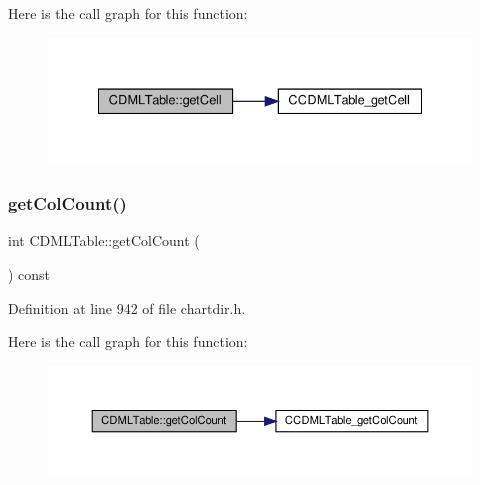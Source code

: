 Here is the call graph for this function\+:
\nopagebreak
\begin{figure}[H]
\begin{center}
\leavevmode
\includegraphics[width=335pt]{class_c_d_m_l_table_ae4d272ac2aeaaadea380aff21500a176_cgraph}
\end{center}
\end{figure}
\mbox{\label{class_c_d_m_l_table_a5e8f4f631d3b13d12f02126232762630}} 
\subsubsection{\texorpdfstring{get\+Col\+Count()}{getColCount()}}
{\footnotesize\ttfamily int C\+D\+M\+L\+Table\+::get\+Col\+Count (\begin{DoxyParamCaption}{ }\end{DoxyParamCaption}) const\hspace{0.3cm}{\ttfamily [inline]}}



Definition at line 942 of file chartdir.\+h.

Here is the call graph for this function\+:
\nopagebreak
\begin{figure}[H]
\begin{center}
\leavevmode
\includegraphics[width=350pt]{class_c_d_m_l_table_a5e8f4f631d3b13d12f02126232762630_cgraph}
\end{center}
\end{figure}
\mbox{\label{class_c_d_m_l_table_a66421a52cef917dcf33ab52dcde819af}} 
